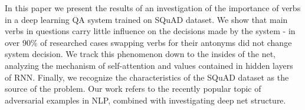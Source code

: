 In this paper we present the results of an investigation of the importance of verbs in a deep learning QA system trained on SQuAD dataset. We show that main verbs in questions carry little influence on the decisions made by the system - in over 90\% of researched cases swapping verbs for their antonyms did not change system decision. We track this phenomenon down to the insides of the net, analyzing the mechanism of self-attention and values contained in hidden layers of RNN. Finally, we recognize the characteristics of the SQuAD dataset as the source of the problem. Our work refers to the recently popular topic of adversarial examples in NLP, combined with investigating deep net structure.
